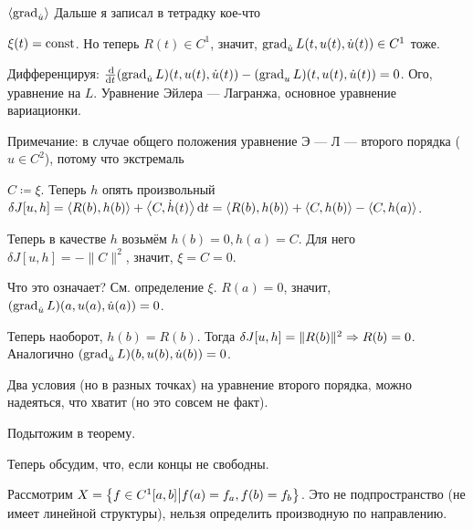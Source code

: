 \documentclass[a4paper]{report}
\begin{document}
    $\left\langle\operatorname{grad}_{\dot{u}}\right\rangle$
    Дальше я записал в тетрадку кое-что

    $\xi(t) = \operatorname{const}$. Но теперь $R(t) \in C^1$, значит, $\operatorname{grad}_{\dot{u}}L(t, u(t), \dot{u}(t)) \in C^1$ тоже.

    Дифференцируя: $\frac{\operatorname{d}\!}{\operatorname{d}\! t}(\operatorname{grad}_{\dot{u}} L)(t, u(t), \dot{u}(t)) - (\operatorname{grad}_u L)(t, u(t), \dot{u}(t)) = 0$. Ого, уравнение на $L$. Уравнение Эйлера --- Лагранжа, основное уравнение вариационки.

    Примечание: в случае общего положения уравнение Э --- Л --- второго порядка ($u \in C^2$), потому что экстремаль 

    $C \coloneqq \xi$. Теперь $h$ опять произвольный $\delta J[u, h] = \left\langle R(b), h(b)\right\rangle + \left\langle C, \dot{h}(t)\right\rangle\operatorname{d}\! t = \left\langle R(b), h(b)\right\rangle + \left\langle C, h(b)\right\rangle - \left\langle C, h(a)\right\rangle$.

    Теперь в качестве $h$ возьмём $h(b) = 0, h(a) = C$. Для него $\delta J[u, h] = -\|C\|^2$, значит, $\xi = C = 0$.

    Что это означает? См. определение $\xi$. $R(a) = 0$, значит, $(\operatorname{grad}_{\dot{u}} L)(a, u(a), \dot{u}(a)) = 0$.

    Теперь наоборот, $h(b) = R(b)$. Тогда $\delta J[u, h] = \|R(b)\|^2 \Rightarrow R(b) = 0$.
    Аналогично $(\operatorname{grad}_{\dot{u}} L)(b, u(b), \dot{u}(b)) = 0$.

    Два условия (но в разных точках) на уравнение второго порядка, можно надеяться, что хватит (но это совсем не факт).

    Подытожим в теорему.

    Теперь обсудим, что, если концы не свободны.

    Рассмотрим $X = \left\{f \in C^1[a, b]\middle|f(a) = f_a, f(b) = f_b\right\}$. Это не подпространство (не имеет линейной структуры), нельзя определить производную по направлению.
\end{document}
